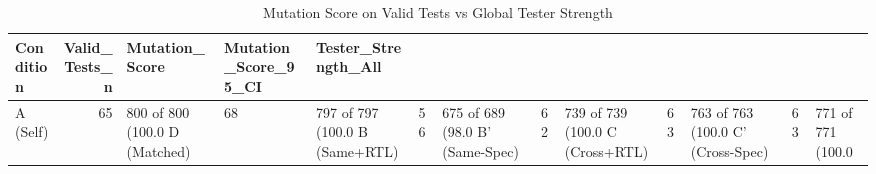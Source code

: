 \begin{table}
\caption{Mutation Score on Valid Tests vs Global Tester Strength}
\label{tab:mutation_strength}
\begin{tabular}{lrlll}
\toprule
Condition & Valid_Tests_n & Mutation_Score & Mutation_Score_95_CI & Tester_Strength_All \\
\midrule
A (Self) & 65 & 800 of 800 (100.0%
D (Matched) & 68 & 797 of 797 (100.0%
B (Same+RTL) & 56 & 675 of 689 (98.0%
B' (Same-Spec) & 62 & 739 of 739 (100.0%
C (Cross+RTL) & 63 & 763 of 763 (100.0%
C' (Cross-Spec) & 63 & 771 of 771 (100.0%
\bottomrule
\end{tabular}
\end{table}
